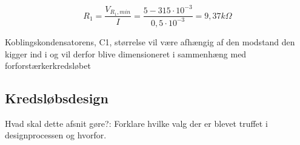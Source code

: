 \begin{equation}
R_1 =  \frac{V_{R_1,min}}{I} = \frac{5-315 \cdot 10^{-3}}{0,5 \cdot 10^{-3}} = 9,37 k\Omega
\end{equation}

Koblingskondensatorens, C1, størrelse vil være afhængig af den modstand den kigger ind i og vil derfor blive dimensioneret i sammenhæng med forforstærkerkredsløbet 

\subsection*{Kredsløbsdesign}

Hvad skal dette afsnit gøre?:
Forklare hvilke valg der er blevet truffet i designprocessen og hvorfor.



